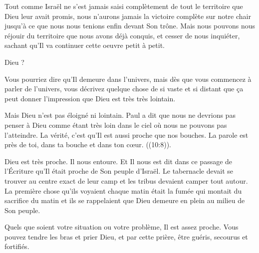 Tout comme Israël ne s'est jamais saisi complètement
 de tout le territoire que Dieu leur avait promis,
 nous n'aurons jamais la victoire complète sur notre chair
 jusqu'à ce que nous nous tenions enfin devant Son trône.
 Mais nous pouvons nous réjouir du territoire que nous avons déjà conquis,
 et cesser de nous inquiéter, sachant qu'Il va continuer cette oeuvre
 \ocadr{}petit à petit. 

\dvrule






 Dieu ?

Vous pourriez dire qu'Il demeure dans l'univers,
 mais dès que vous commencez à parler de l'univers,
 vous décrivez quelque chose de si vaste et si distant
 que ça peut donner l'impression que Dieu est très très lointain.

Mais Dieu n'est pas éloigné ni lointain.
 Paul a dit que nous ne devrions pas penser à Dieu comme étant très loin
 dans le ciel où nous ne pouvons pas l'atteindre.
 La vérité, c'est qu'Il est aussi proche que nos bouches.
 \og La parole est près de toi, dans ta bouche et dans ton cœur. \fg{}
 ((10:8)).

Dieu est très proche. Il nous entoure.
 Et Il nous est dit dans ce passage de l'Écriture
 qu'Il était proche de Son peuple d'Israël.
 Le tabernacle devait se trouver au centre exact de leur camp
 et les tribus devaient camper tout autour.
 La première chose qu'ils voyaient chaque matin était la fumée
 qui montait du sacrifice du matin
 \ocadr{}et ils se rappelaient que Dieu demeure en plein au milieu de Son peuple.


Quels que soient votre situation ou votre problème, Il est assez proche.
 Vous pouvez tendre les bras et prier Dieu, et par cette prière,
 être guéris, secourus et fortifiés. 

